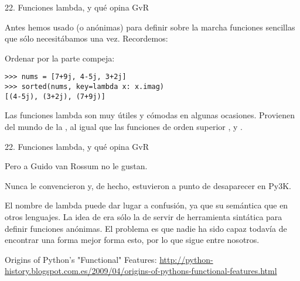 \begin{frame}[fragile]{22. \large Funciones lambda, y qué opina GvR}
  \small
  \begin{center}
    Antes hemos usado  (o anónimas) para
    definir sobre la marcha funciones sencillas que sólo necesitábamos
    una vez. Recordemos:
  \end{center}

  \footnotesize
  \begin{exampleblock}
    {Ordenar por la parte compeja:}
    \begin{lstlisting}
>>> nums = [7+9j, 4-5j, 3+2j]
>>> sorted(nums, key=lambda x: x.imag)
[(4-5j), (3+2j), (7+9j)]
    \end{lstlisting}
  \end{exampleblock}

  \small
  \begin{block}{}
    \centering
    Las funciones lambda son muy útiles y cómodas en algunas
    ocasiones.  Provienen del mundo de la , al igual que las funciones de orden superior
    ,  y .
  \end{block}
\end{frame}

\begin{frame}[fragile]{22. \large Funciones lambda, y qué opina GvR}
  \begin{alertblock}{}
    \large
    \centering
    Pero a Guido van Rossum no le gustan.
  \end{alertblock}

  \small
  \begin{center}
    Nunca le convencieron y, de hecho, estuvieron a punto de desaparecer en Py3K.
  \end{center}

  \footnotesize
  \begin{center}
    El nombre de lambda puede dar lugar a confusión, ya que su
    semántica  que en otros lenguajes. La
    idea de  era sólo la de servir de herramienta
    sintática para definir funciones anónimas. El problema es que
    nadie ha sido capaz todavía de encontrar una forma mejor forma
    esto, por lo que  sigue entre nosotros.
   \end{center}

  \begin{block}
    {\centering Origins of Python's "Functional" Features:}
    \centering \url{http://python-history.blogspot.com.es/2009/04/origins-of-pythons-functional-features.html}
  \end{block}
\end{frame}

